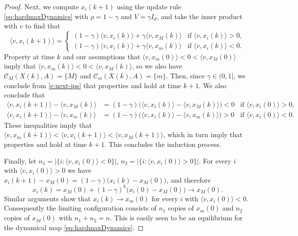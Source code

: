 \documentclass[10pt,a4paper]{amsart}
\begin{document}
\begin{proof}
Next, we compute $x_i(k+1)$ using the update rule \eqref{eq:hardmaxDynamics} with $\rho=1-\gamma$ and $V=\gamma I_d$, and take the inner product with $v$ to find that
\begin{equation}\label{e:next-ips}
\langle v, x_i(k+1)\rangle =
\begin{cases}
(1-\gamma)\langle v, x_i(k)\rangle + \gamma \langle v, x_M(k)\rangle
& \text{if }\langle v, x_i(k)\rangle>0,\\
(1-\gamma)\langle v, x_i(k)\rangle + \gamma \langle v, x_m(k)\rangle
& \text{if }\langle v, x_i(k)\rangle<0.
\end{cases}
\end{equation}
Property  at time $k$ and our assumptions that $\langle v,x_m(0)\rangle < 0 < \langle v,x_M(0)\rangle$ imply that $\langle v,x_m(k)\rangle < 0 < \langle v,x_M(k)\rangle$, so we also have $\mathcal C_M(X(k),A)=\{M\}$ and $\mathcal C_m(X(k),A)=\{m\}$. Then, since $\gamma \in (0,1]$, we conclude from \cref{e:next-ips} that properties  and  hold at time $k+1$. We also conclude that
\begin{align*}
\langle v,x_i(k+1)\rangle-\langle v,x_M(k)\rangle
&=(1-\gamma)\bigl(\langle v,x_i(k)\rangle-\langle v,x_M(k)\rangle\bigr) <0&\text{if }\langle v,x_i(0)\rangle>0,
\\
\langle v,x_i(k+1)\rangle-\langle v,x_m(k)\rangle
&=(1-\gamma)\bigl(\langle v,x_i(k)\rangle-\langle v,x_m(k)\rangle\bigr)>0
&\text{if }\langle v,x_i(0)\rangle<0.
\end{align*}
These inequalities imply that $\langle v,x_m(k+1)\rangle < \langle v,x_i(k+1)\rangle <\langle v,x_M(k+1)\rangle$, which in turn imply that properties  and  hold at time $k+1$. This concludes the induction process.

Finally, let $n_1 = \bigl|\{i:\langle v,x_i(0)\rangle<0\}\bigr|$, $n_2 = \bigl|\{i:\langle v,x_i(0)\rangle>0\}\bigr|$. For every $i$ with $\langle v,x_i(0)\rangle>0$ we have
$x_i(k+1)-x_M(0)=(1-\gamma)\bigl(x_i(k)-x_M(0)\bigr)$,
and therefore
\[
x_i(k)=x_M(0)+(1-\gamma)^k\bigl(x_i(0)-x_M(0)\bigr)\to x_M(0).
\]
Similar arguments show that $x_i(k)\to x_m(0)$ for every $i$ with $\langle v,x_i(0)\rangle<0$. 
Consequently the limiting configuration consists of $n_1$ copies of $x_m(0)$ and $n_2$ copies of $x_M(0)$ with $n_1+n_2=n$. This is easily seen to be an equilibrium for the dynamical map \cref{eq:hardmaxDynamics}.
\end{proof}
\end{document}
